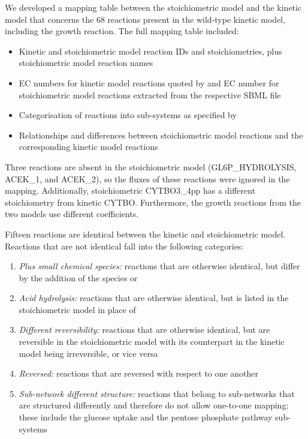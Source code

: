 \documentclass[a4paper, 12pt]{scrartcl}
\begin{document}
{We developed a mapping table between the stoichiometric model and the kinetic model that
concerns the 68 reactions present in the wild-type kinetic model, including the growth reaction. The full mapping table included:
\begin{itemize}
\item Kinetic and stoichiometric model reaction IDs and stoichiometries, plus stoichiometric model reaction names
  \item EC numbers for kinetic model reactions quoted by \citet{millard_metabolic_2017} and EC number for stoichiometric model reactions extracted from the respective SBML file
\item Categorisation of reactions into sub-systems as specified by \citet{millard_metabolic_2017}
  \item Relationships and differences between stoichiometric model reactions and the corresponding kinetic model reactions
\end{itemize}

Three reactions are absent in the stoichiometric model (GL6P\_HYDROLYSIS, ACEK\_1, and ACEK\_2), so the fluxes of these reactions were ignored in the mapping. Additionally, stoichiometric CYTBO3\_4pp has a different stoichiometry from kinetic CYTBO. Furthermore, the growth reactions from the two models use different coefficients.

Fifteen reactions are identical between the kinetic and stoichiometric model. Reactions that are not identical fall into the following categories:

\begin{enumerate}
\item \emph{Plus small chemical species:} reactions that are otherwise identical, but differ by the addition of the species  or 
\item \emph{Acid hydrolysis:} reactions that are otherwise identical, but  is listed in the stoichiometric model in place of 
\item \emph{Different reversibility:} reactions that are otherwise identical, but are reversible in the stoichiometric model with its counterpart in the kinetic model being irreversible, or vice versa
\item \emph{Reversed:} reactions that are reversed with respect to one another
  \item \emph{Sub-network different structure:} reactions that belong to sub-networks that are structured differently and therefore do not allow one-to-one mapping; these include the glucose uptake and the pentose phosphate pathway sub-systems
  \end{enumerate}

}
\end{document}

